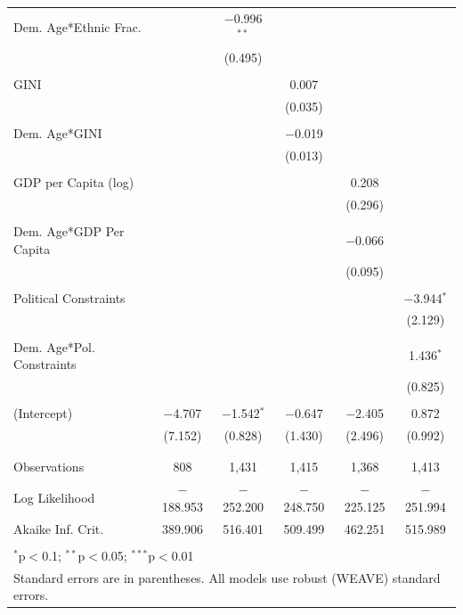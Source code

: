 \documentclass[a4paper]{article}\usepackage[]{graphicx}\usepackage[]{color}
\begin{document}
\begin{table}
\begin{center}
{\begin{tabular}{@{\extracolsep{5pt}}lccccc}
 Dem. Age*Ethnic Frac. &  & $-$0.996$^{**}$ &  &  &  \\ 
  &  & (0.495) &  &  &  \\ 
  & & & & & \\ 
 GINI &  &  & 0.007 &  &  \\ 
  &  &  & (0.035) &  &  \\ 
  & & & & & \\ 
 Dem. Age*GINI &  &  & $-$0.019 &  &  \\ 
  &  &  & (0.013) &  &  \\ 
  & & & & & \\ 
 GDP per Capita (log) &  &  &  & 0.208 &  \\ 
  &  &  &  & (0.296) &  \\ 
  & & & & & \\ 
 Dem. Age*GDP Per Capita &  &  &  & $-$0.066 &  \\ 
  &  &  &  & (0.095) &  \\ 
  & & & & & \\ 
 Political Constraints &  &  &  &  & $-$3.944$^{*}$ \\ 
  &  &  &  &  & (2.129) \\ 
  & & & & & \\ 
 Dem. Age*Pol. Constraints &  &  &  &  & 1.436$^{*}$ \\ 
  &  &  &  &  & (0.825) \\ 
  & & & & & \\ 
 (Intercept) & $-$4.707 & $-$1.542$^{*}$ & $-$0.647 & $-$2.405 & 0.872 \\ 
  & (7.152) & (0.828) & (1.430) & (2.496) & (0.992) \\ 
  & & & & & \\ 
\hline \\[-1.8ex] 
Observations & 808 & 1,431 & 1,415 & 1,368 & 1,413 \\ 
Log Likelihood & $-$188.953 & $-$252.200 & $-$248.750 & $-$225.125 & $-$251.994 \\ 
Akaike Inf. Crit. & 389.906 & 516.401 & 509.499 & 462.251 & 515.989 \\ 
\hline 
\hline \\[-1.8ex] 
\multicolumn{6}{l}{$^{*}$p$<$0.1; $^{**}$p$<$0.05; $^{***}$p$<$0.01} \\ 
\multicolumn{6}{l}{Standard errors are in parentheses. All models use robust (WEAVE) standard errors.} \\ 
\end{tabular} 

    }
    \end{center}
\end{table}
\end{document}
